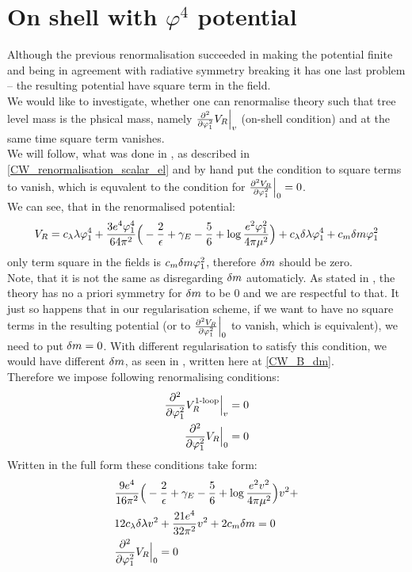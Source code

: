 \section{On shell with $\varphi^4$ potential}\label{onshellphi4}
Although the previous renormalisation succeeded in making the potential finite and being in 
agreement with radiative symmetry breaking it has one last problem -- the resulting potential have 
square term in the field. \\
We would like to investigate, whether one can renormalise theory such that tree 
level mass is the phsical mass, namely $\frac{\partial^2 }{\partial \varphi_1^2}V_R\Big|_{v}$ (on-shell condition) and at the 
same time square term vanishes. \\
We will follow, what was done in \cite{Coleman1973}, as described in 
\ref{CW_renormalisation_scalar_el} and by hand put the condition to square terms to vanish, 
which is equvalent to the condition for $\frac{\partial^2 V_R}{\partial \varphi_1^2}\Big|_{0} = 0$. \\
We can see, that in the renormalised potential:
\begin{align}
V_R = c_\lambda\lambda\varphi_1^4 + \frac{3e^4\varphi_1^4}{64\pi^2}\Big(-\frac{2}{\epsilon}+\gamma_E- 
\frac{5}{6}+
\log{\frac{e^2\varphi_1^2}{4\pi\mu^2}}\Big) + c_\lambda\delta\lambda\varphi_1^4+c_m\delta m\varphi_1^2
\end{align}
only term square in the fields is $c_m\delta m\varphi_1^2$, therefore $\delta m$ should be zero. \\
Note, that it is not the same as disregarding $\delta m$ automaticly. As stated in \cite{Coleman1973}, 
the theory has no a priori symmetry for $\delta m$ to be $0$ and we are respectful to that. 
It just so happens that in our regularisation scheme, if we want to have no square terms in the 
resulting potential (or to $\frac{\partial^2 V_R}{\partial \varphi_1^2}\Big|_{0}$ to vanish, which is equivalent), we need to put 
$\delta m = 0$. With different regularisation to satisfy this condition, we would have different $\delta m$, 
as seen in \cite{Coleman1973}, written here at \ref{CW_B_dm}. \\
Therefore we impose following renormalising conditions:
\begin{align}
\frac{\partial^2 }{\partial \varphi_1^2}V_R^{\textrm{1-loop}}\Big|_{v}=0 \\
\frac{\partial^2 }{\partial \varphi_1^2}V_R\Big|_{0}=0
\end{align}
Written in the full form these conditions take form:
\begin{align}
&\frac{9e^4}{16\pi^2}\Big(-\frac{2}{\epsilon}+\gamma_E-\frac{5}{6}+\log\frac{e^2
v^2}{4\pi\mu^2}\Big)v^2+ \notag\\
& 12c_\lambda\delta\lambda v^2+\frac{21e^4}{32\pi^2}v^2+2c_m\delta m = 0 \\
&\frac{\partial^2 }{\partial \varphi_1^2}V_R\Big|_{0} = 0
\end{align}
